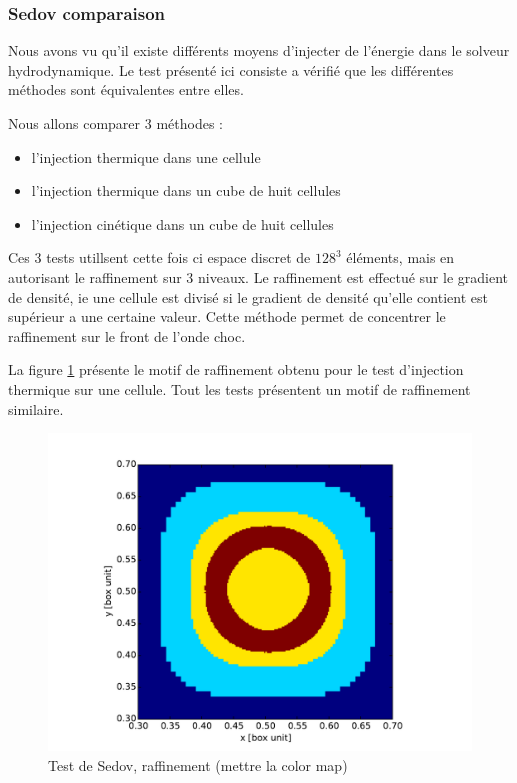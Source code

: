 


\subsubsection{Sedov comparaison}

Nous avons vu qu'il existe différents moyens d'injecter de l'énergie dans le solveur hydrodynamique.
Le test présenté ici consiste a vérifié que les différentes méthodes sont équivalentes entre elles.

Nous allons comparer 3 méthodes : 
\begin{itemize}
\item l'injection thermique dans une cellule 
\item l'injection thermique dans un cube de huit cellules
\item l'injection cinétique  dans un cube de huit cellules
\end{itemize}


Ces 3 tests utillsent cette fois ci espace discret de  $128^3$ éléments, mais en autorisant le raffinement sur 3 niveaux.
Le raffinement est effectué sur le gradient de densité, ie une cellule est divisé si le gradient de densité qu'elle contient est supérieur a une certaine valeur.
Cette méthode permet de concentrer le raffinement sur le front de l'onde choc.

La figure \ref{fig:sedovraff} présente le motif de raffinement obtenu pour le test d'injection thermique sur une cellule.
Tout les tests présentent un motif de raffinement similaire.

\begin{figure}[htpb]
        \includegraphics[width=.95\linewidth]{img/03/sedov/slice_th_1raf.pdf} 
        \caption{Test de Sedov, raffinement (mettre la color map) }
 		\label{fig:sedovraff}
\end{figure}

